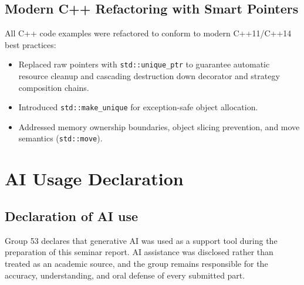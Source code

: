 \documentclass[11pt,a4paper]{report}
\begin{document}
\section{Modern C++ Refactoring with Smart Pointers}
All C++ code examples were refactored to conform to modern C++11/C++14 best practices:
\begin{itemize}
  \item Replaced raw pointers with \texttt{std::unique\_ptr} to guarantee automatic resource cleanup and cascading destruction down decorator and strategy composition chains.
  \item Introduced \texttt{std::make\_unique} for exception-safe object allocation.
  \item Addressed memory ownership boundaries, object slicing prevention, and move semantics (\texttt{std::move}).
\end{itemize}

\chapter{AI Usage Declaration}
\section{Declaration of AI use}
Group 53 declares that generative AI was used as a support tool during the
preparation of this seminar report. AI assistance was disclosed rather than
treated as an academic source, and the group remains responsible for the
accuracy, understanding, and oral defense of every submitted part.
\end{document}
